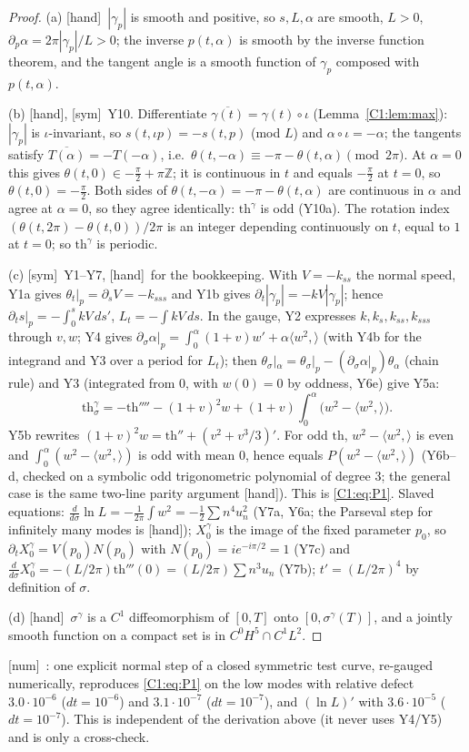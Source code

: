 \documentclass[11pt]{article}
\newcommand{\fn}[1]{\texttt{\detokenize{#1}}}
\newcommand{\tH}{\textup{[hand]}}\newcommand{\tS}{\textup{[sym]}}\newcommand{\tC}{\textup{[cert]}}\newcommand{\tI}{\textup{[cited]}}\newcommand{\tN}{\textup{[num]}}
\newcommand{\ip}[2]{\langle#1,#2\rangle}
\begin{document}
\begin{proof}
(a) \tH\ $|\gamma_p|$ is smooth and positive, so $s,L,\alpha$ are smooth, $L>0$, $\partial_p\alpha=2\pi|\gamma_p|/L>0$; the inverse $p(t,\alpha)$ is smooth by the inverse function theorem, and the tangent angle is a smooth function of $\gamma_p$ composed with $p(t,\alpha)$.

(b) \tH, \tS\ Y10. Differentiate $\overline{\gamma(t)}=\gamma(t)\circ\iota$ (Lemma~\ref{C1:lem:max}): $|\gamma_p|$ is $\iota$-invariant, so $s(t,\iota p)=-s(t,p)$ (mod $L$) and $\alpha\circ\iota=-\alpha$; the tangents satisfy $\overline{T(\alpha)}=-T(-\alpha)$, i.e.\ $\theta(t,-\alpha)\equiv-\pi-\theta(t,\alpha)\pmod{2\pi}$. At $\alpha=0$ this gives $\theta(t,0)\in-\frac\pi2+\pi\mathbb Z$; it is continuous in $t$ and equals $-\frac\pi2$ at $t=0$, so $\theta(t,0)=-\frac\pi2$. Both sides of $\theta(t,-\alpha)=-\pi-\theta(t,\alpha)$ are continuous in $\alpha$ and agree at $\alpha=0$, so they agree identically: $\mathrm{th}^\gamma$ is odd (Y10a). The rotation index $(\theta(t,2\pi)-\theta(t,0))/2\pi$ is an integer depending continuously on $t$, equal to $1$ at $t=0$; so $\mathrm{th}^\gamma$ is periodic.

(c) \tS\ Y1--Y7, \tH\ for the bookkeeping. With $V=-k_{ss}$ the normal speed, Y1a gives $\theta_t|_p=\partial_sV=-k_{sss}$ and Y1b gives $\partial_t|\gamma_p|=-kV|\gamma_p|$; hence $\partial_ts|_p=-\int_0^skV\,ds'$, $L_t=-\int kV\,ds$. In the gauge, Y2 expresses $k,k_s,k_{ss},k_{sss}$ through $v,w$; Y4 gives $\partial_\sigma\alpha|_p=\int_0^\alpha(1+v)w'+\alpha\ip{w^2}{}$ (with Y4b for the integrand and Y3 over a period for $L_t$); then $\theta_\sigma|_\alpha=\theta_\sigma|_p-(\partial_\sigma\alpha|_p)\theta_\alpha$ (chain rule) and Y3 (integrated from $0$, with $w(0)=0$ by oddness, Y6e) give Y5a:
\[\mathrm{th}^\gamma_\sigma=-\mathrm{th}''''-(1+v)^2w+(1+v)\int_0^\alpha\bigl(w^2-\ip{w^2}{}\bigr).\]
Y5b rewrites $(1+v)^2w=\mathrm{th}''+(v^2+v^3/3)'$. For odd $\mathrm{th}$, $w^2-\ip{w^2}{}$ is even and $\int_0^\alpha(w^2-\ip{w^2}{})$ is odd with mean $0$, hence equals $P(w^2-\ip{w^2}{})$ (Y6b--d, checked on a symbolic odd trigonometric polynomial of degree 3; the general case is the same two-line parity argument \tH). This is \eqref{C1:eq:P1}. Slaved equations: $\frac{d}{d\sigma}\ln L=-\frac1{2\pi}\int w^2=-\frac12\sum n^4u_n^2$ (Y7a, Y6a; the Parseval step for infinitely many modes is \tH); $X_0^\gamma$ is the image of the fixed parameter $p_0$, so $\partial_tX^\gamma_0=V(p_0)N(p_0)$ with $N(p_0)=ie^{-i\pi/2}=1$ (Y7c) and $\frac{d}{d\sigma}X^\gamma_0=-(L/2\pi)\mathrm{th}'''(0)=(L/2\pi)\sum n^3u_n$ (Y7b); $t'=(L/2\pi)^4$ by definition of $\sigma$.

(d) \tH\ $\sigma^\gamma$ is a $C^1$ diffeomorphism of $[0,T]$ onto $[0,\sigma^\gamma(T)]$, and a jointly smooth function on a compact set is in $C^0H^5\cap C^1L^2$.
\end{proof}
\noindent\tN\ \fn{C1_num.py}: one explicit normal step of a closed symmetric test curve, re-gauged numerically, reproduces \eqref{C1:eq:P1} on the low modes with relative defect $3.0\cdot10^{-6}$ ($dt=10^{-6}$) and $3.1\cdot10^{-7}$ ($dt=10^{-7}$), and $(\ln L)'$ with $3.6\cdot10^{-5}$ ($dt=10^{-7}$). This is independent of the derivation above (it never uses Y4/Y5) and is only a cross-check.
\end{document}
